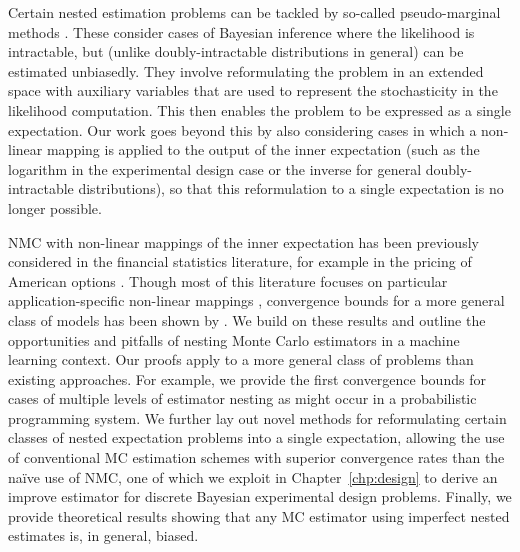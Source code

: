 Certain nested estimation problems can be tackled by so-called pseudo-marginal methods
\citep{beaumont2003estimation,andrieu2009pseudo,andrieu2010particle,
	andrieu2015convergence,andersson2015nested}.
These consider cases of Bayesian inference where the likelihood is intractable, 
but (unlike doubly-intractable distributions in general) can
be estimated unbiasedly.
They involve reformulating the problem in an extended space with auxiliary variables that
are used to represent the stochasticity in the likelihood computation. This then enables the
problem to be expressed as a single expectation.
Our work goes beyond this by also considering cases in which a non-linear mapping is
applied to the output of the inner expectation (such as the logarithm in the 
experimental design case or the inverse for general doubly-intractable distributions), so that 
this reformulation to a single expectation is no longer possible.

NMC with non-linear mappings of the inner expectation has been previously considered in
the financial statistics literature, for example in the pricing of American
options \citep{longstaff2001valuing}. Though most of this literature focuses on
particular application-specific non-linear mappings \citep{broadie2011efficient,gordy2010nested},
convergence bounds for a more general class of models
has been shown by \citet{hong2009estimating}.
We build on these results and outline the opportunities and pitfalls of nesting Monte Carlo
estimators in a machine learning context.
Our proofs apply to a more general class of problems than existing approaches.
For example, we provide the first convergence bounds for cases of multiple levels of estimator nesting
as might occur in a probabilistic programming system.
We further lay out novel methods for reformulating certain classes of nested expectation problems
into a single expectation, allowing the use of conventional MC estimation 
schemes with superior convergence rates than the na\"{i}ve use of NMC, one of which we
exploit in Chapter~\ref{chp:design} to derive an improve estimator for discrete
Bayesian experimental design problems.
Finally, we provide theoretical results showing that any MC
estimator using imperfect nested estimates is, in general, biased.



